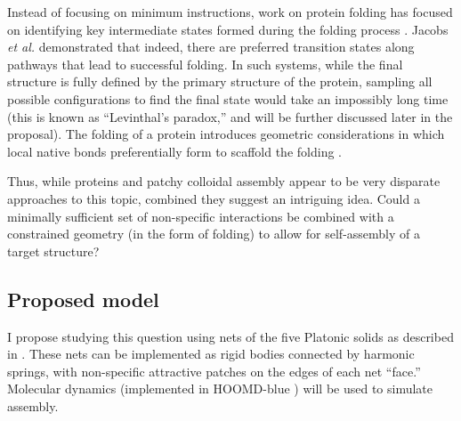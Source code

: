 
Instead of focusing on minimum instructions, work on protein folding has focused on identifying key intermediate states formed during the folding process \cite{Jacobs_2016_BiophysicalJournal}.
Jacobs \textit{et al.} demonstrated that indeed, there are preferred transition states along pathways that lead to successful folding.
In such systems, while the final structure is fully defined by the primary structure of the protein, sampling all possible configurations to find the final state would take an impossibly long time (this is known as ``Levinthal's paradox,'' and will be further discussed later in the proposal).
The folding of a protein introduces geometric considerations in which local native bonds preferentially form to scaffold the folding \cite{Dill_1993_PNAS}.

Thus, while proteins and patchy colloidal assembly appear to be very disparate approaches to this topic, combined they suggest an intriguing idea. 
Could a minimally sufficient set of non-specific interactions be combined with a constrained geometry (in the form of folding) to allow for self-assembly of a target structure?  




\subsection*{Proposed model}

I propose studying this question using nets of the five Platonic solids as described in \cite{Dodd_2018_unpublished}.
These nets can be implemented as rigid bodies connected by harmonic springs, with non-specific attractive patches on the edges of each net ``face.''
Molecular dynamics (implemented in HOOMD-blue \cite{HOOMD_2008, HOOMD_2015}) will be used to simulate assembly.


